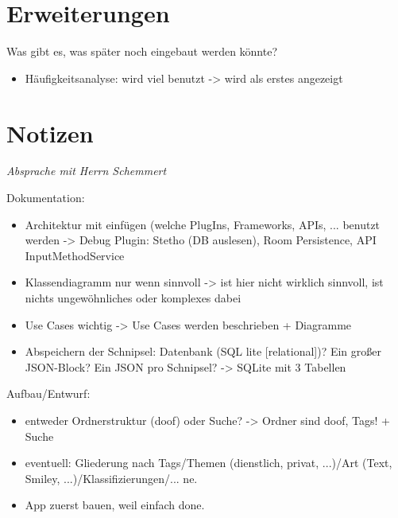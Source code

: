 \documentclass[11pt]{article}
\begin{document}
	\section{Erweiterungen}
	Was gibt es, was später noch eingebaut werden könnte?
	\begin{itemize}
		\item Häufigkeitsanalyse: wird viel benutzt -> wird als erstes angezeigt
	\end{itemize}
	
	\section{Notizen}
	\emph{Absprache mit Herrn Schemmert}
	
	Dokumentation:
	\begin{itemize}
		\item Architektur mit einfügen (welche PlugIns, Frameworks, APIs, ... benutzt werden -> Debug Plugin: Stetho (DB auslesen), Room Persistence, API InputMethodService
		\item Klassendiagramm nur wenn sinnvoll -> ist hier nicht wirklich sinnvoll, ist nichts ungewöhnliches oder komplexes dabei
		\item Use Cases wichtig -> Use Cases werden beschrieben + Diagramme
		\item Abspeichern der Schnipsel: Datenbank (SQL lite [relational])? Ein großer JSON-Block? Ein JSON pro Schnipsel? -> SQLite mit 3 Tabellen
	\end{itemize}	
	Aufbau/Entwurf:
	\begin{itemize}
		\item entweder Ordnerstruktur (doof) oder Suche? -> Ordner sind doof, Tags! + Suche
		\item eventuell: Gliederung nach Tags/Themen (dienstlich, privat, ...)/Art (Text, Smiley, ...)/Klassifizierungen/... ne.
		\item App zuerst bauen, weil einfach done.
	\end{itemize}
	
	
\end{document}
